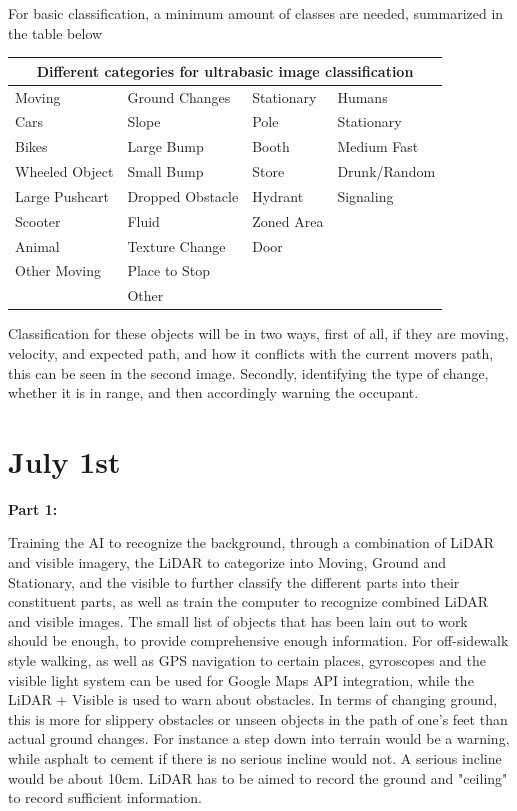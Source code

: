 \documentclass{article}
\begin{document}
For basic classification, a minimum amount of classes are needed, summarized in the table below

\begin{tabular}{ |p{2.5cm}||p{2.8cm}||p{1.8cm}||p{2.45cm}|  }
    \hline
    \multicolumn{4}{|c|}{Different categories for ultrabasic image classification } \\
    \hline
    Moving & Ground Changes & Stationary & Humans\\
    \hline
    \hline
    Cars            & Slope             & Pole      & Stationary\\
    Bikes           & Large Bump        & Booth     & Medium Fast\\
    Wheeled Object  & Small Bump        & Store     & Drunk/Random\\
    Large Pushcart  & Dropped Obstacle  & Hydrant   & Signaling\\
    Scooter         & Fluid             & Zoned Area& \\
    Animal          & Texture Change    & Door      & \\
    Other Moving    & Place to Stop     &           & \\
                    & Other             &           & \\
    \hline
\end{tabular}

    
Classification for these objects will be in two ways, first of all, if they are moving, velocity, and expected path, and how it conflicts with the current movers path, this can be seen in the second image. Secondly, identifying the type of change, whether it is in range, and then accordingly warning the occupant.

\section{July 1st}

\textbf{Part 1:}

Training the AI to recognize the background, through a combination of LiDAR and visible imagery, the LiDAR to categorize into Moving, Ground and Stationary, and the visible to further classify the different parts into their constituent parts, as well as train the computer to recognize combined LiDAR and visible images. The small list of objects that has been lain out to work should be enough, to provide comprehensive enough information. For off-sidewalk style walking, as well as GPS navigation to certain places, gyroscopes and the visible light system can be used for Google Maps API integration, while the LiDAR + Visible is used to warn about obstacles. In terms of changing ground, this is more for slippery obstacles or unseen objects in the path of one's feet than actual ground changes. For instance a step down into terrain would be a warning, while asphalt to cement if there is no serious incline would not. A serious incline would be about 10cm. LiDAR has to be aimed to record the ground and "ceiling" to record sufficient information.
\end{document}
